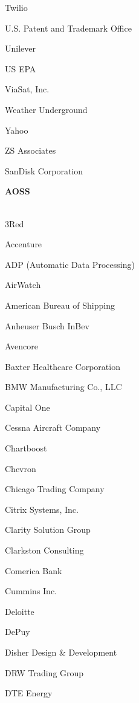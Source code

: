 \documentclass[twoside]{article}
\begin{document}
\begin{center}
\begin{multicols}{5}
\begin{FlushLeft}
\begin{compactitem}
\item Twilio
\item U.S. Patent and Trademark Office
\item Unilever
\item US EPA
\item ViaSat, Inc.
\item Weather Underground
\item Yahoo
\item ZS Associates
\item SanDisk Corporation
\end{compactitem}
        \end{FlushLeft}
        \vspace{1em}
        {\fontsize{14}{16}\selectfont \bf AOSS}\\
        \vspace{-1em}
        ~\hrulefill~
        \vspace{-.9em}
        \begin{FlushLeft}
        \begin{compactitem}
        \item 3Red
\item Accenture
\item ADP (Automatic Data Processing)
\item AirWatch
\item American Bureau of Shipping
\item Anheuser Busch InBev
\item Avencore
\item Baxter Healthcare Corporation
\item BMW Manufacturing Co., LLC
\item Capital One
\item Cessna Aircraft Company
\item Chartboost
\item Chevron
\item Chicago Trading Company
\item Citrix Systems, Inc.
\item Clarity Solution Group
\item Clarkston Consulting
\item Comerica Bank
\item Cummins Inc.
\item Deloitte
\item DePuy
\item Disher Design \& Development
\item DRW Trading Group
\item DTE Energy

\end{compactitem}
\end{FlushLeft}
\end{multicols}
\end{center}
\end{document}
